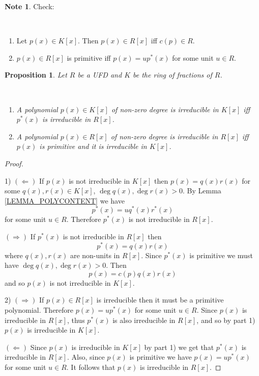 \documentclass[12pt, letterpaper, oneside]{article}
\theoremstyle{plain}
\newtheorem{proposition}[theorem]{Proposition}
\theoremstyle{definition}
\newtheorem{note}[theorem]{Note}
\newcommand{\benu}{\begin{enumerate}}
\newcommand{\eenu}{\end{enumerate}}
\newcommand{\vs}{\vskip 5mm}
\begin{document}
 
\vs\vs

\begin{note} Check:
\label{NOTE_CONTENTRX}
\vskip -13mm

\ 
\benu
\item Let $p(x)\in K[x]$. Then $p(x)\in R[x]$ iff $c(p)\in R$.
\item $p(x)\in R[x]$ is primitive iff $p(x) = up^{\ast}(x)$ for some unit $u\in R$.
\eenu
\end{note}

\vs\vs

\begin{proposition}
\label{PROP_IRREDINKANDR}
Let $R$ be a UFD and $K$ be the ring of fractions of $R$.

\vskip -13mm

\ 
\benu
\item A polynomial  $p(x)\in K[x]$ of non-zero degree is irreducible in $K[x]$ iff 
$p^{\ast}(x)$ is irreducible in $R[x]$.
\item A polynomial $p(x)\in R[x]$ of non-zero degree is irreducible in $R[x]$ iff $p(x)$ is primitive and 
it is irreducible in $K[x]$.
\eenu
\end{proposition} 
 
 \vs
 
 \begin{proof}\ 
 
 1) $(\Leftarrow)$ If $p(x)$ is not irreducible in $K[x]$ then $p(x) = q(x)r(x)$ for some 
 $q(x), r(x)\in K[x]$, $\deg q(x), \deg r(x) >0$. By Lemma \ref{LEMMA_POLYCONTENT}
 we have 
 $$p^{\ast}(x) = uq^{\ast}(x)r^{\ast}(x)$$
 for some unit $u\in R$. Therefore $p^{\ast}(x)$ is not irreducible in $R[x]$.
 
 
 $(\Rightarrow)$ If $p^{\ast}(x)$ is not irreducible in $R[x]$ then 
 $$p^{\ast}(x) = q(x)r(x)$$
 where $q(x), r(x)$ are non-units in $R[x]$. Since $p^{\ast}(x)$ is primitive we must have 
 $\deg q(x), \deg r(x) >0$. Then
 $$p(x) = c(p)q(x)r(x)$$
 and so $p(x)$ is not irreducible in $K[x]$.
     
     
 \vs
 
 
 2) $(\Rightarrow)$ 
If $p(x)\in R[x]$ is irreducible then it must be a primitive polynomial.  
Therefore  $p(x) = up^{\ast}(x)$ for some unit $u\in R$. 
 Since $p(x)$ is irreducible in $R[x]$, thus $p^{\ast}(x)$ is also irreducible in $R[x]$, and so 
 by part 1) $p(x)$ is irreducible in $K[x]$. 
 
 $(\Leftarrow)$ Since $p(x)$ is irreducible in $K[x]$ by part 1) we get that $p^{\ast}(x)$ is 
 irreducible in $R[x]$. Also, since $p(x)$ is primitive we have $p(x) = up^{\ast}(x)$ for some 
 unit $u\in R$. It follows that $p(x)$ is irreducible in $R[x]$.
   
 \end{proof}
 
\end{document}
